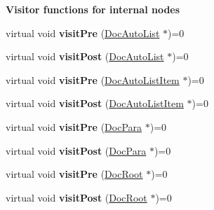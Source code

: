 \begin{Indent}{\bf Visitor functions for internal nodes}\par
\begin{DoxyCompactItemize}
\item 
\hypertarget{class_doc_visitor_a7db40f0c40c8fd5aa0d705465ed4cc79}{virtual void {\bfseries visit\-Pre} (\hyperlink{class_doc_auto_list}{Doc\-Auto\-List} $\ast$)=0}\label{class_doc_visitor_a7db40f0c40c8fd5aa0d705465ed4cc79}

\item 
\hypertarget{class_doc_visitor_a949026affa428cabcc9b7a9791ec9d03}{virtual void {\bfseries visit\-Post} (\hyperlink{class_doc_auto_list}{Doc\-Auto\-List} $\ast$)=0}\label{class_doc_visitor_a949026affa428cabcc9b7a9791ec9d03}

\item 
\hypertarget{class_doc_visitor_a69d92f2a6999722473164f61eecffccc}{virtual void {\bfseries visit\-Pre} (\hyperlink{class_doc_auto_list_item}{Doc\-Auto\-List\-Item} $\ast$)=0}\label{class_doc_visitor_a69d92f2a6999722473164f61eecffccc}

\item 
\hypertarget{class_doc_visitor_a27eb9c9d9b6cc41aea3400ad72582b74}{virtual void {\bfseries visit\-Post} (\hyperlink{class_doc_auto_list_item}{Doc\-Auto\-List\-Item} $\ast$)=0}\label{class_doc_visitor_a27eb9c9d9b6cc41aea3400ad72582b74}

\item 
\hypertarget{class_doc_visitor_a1d9d7fd54874ce3a2be4bdc95d0c8111}{virtual void {\bfseries visit\-Pre} (\hyperlink{class_doc_para}{Doc\-Para} $\ast$)=0}\label{class_doc_visitor_a1d9d7fd54874ce3a2be4bdc95d0c8111}

\item 
\hypertarget{class_doc_visitor_af1a62d0c2075d8998d492c89209f0acd}{virtual void {\bfseries visit\-Post} (\hyperlink{class_doc_para}{Doc\-Para} $\ast$)=0}\label{class_doc_visitor_af1a62d0c2075d8998d492c89209f0acd}

\item 
\hypertarget{class_doc_visitor_a0e77f4120e16fddcf77a023587ddaff2}{virtual void {\bfseries visit\-Pre} (\hyperlink{class_doc_root}{Doc\-Root} $\ast$)=0}\label{class_doc_visitor_a0e77f4120e16fddcf77a023587ddaff2}

\item 
\hypertarget{class_doc_visitor_a1f5ed2b9d7742dded755e7fbad611085}{virtual void {\bfseries visit\-Post} (\hyperlink{class_doc_root}{Doc\-Root} $\ast$)=0}\label{class_doc_visitor_a1f5ed2b9d7742dded755e7fbad611085}


\end{DoxyCompactItemize}
\end{Indent}
